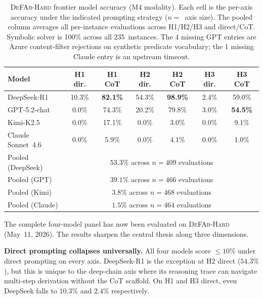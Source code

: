 \documentclass{article}
\theoremstyle{definition}
\begin{document}
\begin{table}[h]
\centering
\caption{\textsc{DeFAb-Hard} frontier model accuracy (M4 modality). Each cell is the per-axis accuracy under the indicated prompting strategy ($n=$~axis size). The pooled column averages all per-instance evaluations across H1/H2/H3 and direct/CoT. Symbolic solver is 100\% across all 235~instances. The 4 missing GPT entries are Azure content-filter rejections on synthetic predicate vocabulary; the 1 missing Claude entry is an upstream timeout.}
\label{tab:defabhard_results}
\small
\begin{tabular}{@{}lcccccc@{}}
\toprule
\textbf{Model} & H1 dir. & H1 CoT & H2 dir. & H2 CoT & H3 dir. & H3 CoT \\
\midrule
DeepSeek-R1         & 10.3\%          & \textbf{82.1\%} & 54.3\%          & \textbf{98.9\%} & 2.4\%  & 59.0\%          \\
GPT-5.2-chat        & 0.0\%           & 74.3\%          & 20.2\%          & 79.8\%          & 3.0\%  & \textbf{54.5\%} \\
Kimi-K2.5           & 0.0\%           & 17.1\%          & 0.0\%           & 3.0\%           & 0.0\%  & 9.1\%           \\
Claude Sonnet~4.6   & 0.0\%           & 5.9\%           & 0.0\%           & 4.1\%           & 0.0\%  & 1.0\%           \\
\midrule
Pooled (DeepSeek)   & \multicolumn{6}{c}{$\mathbf{53.3\%}$ across $n=409$ evaluations}                                         \\
Pooled (GPT)        & \multicolumn{6}{c}{$39.1\%$ across $n=466$ evaluations}                                                  \\
Pooled (Kimi)       & \multicolumn{6}{c}{$3.8\%$ across $n=468$ evaluations}                                                   \\
Pooled (Claude)     & \multicolumn{6}{c}{$1.5\%$ across $n=464$ evaluations}                                                   \\
\bottomrule
\end{tabular}
\end{table}

The complete four-model panel has now been evaluated on \textsc{DeFAb-Hard} (May~11, 2026). The results sharpen the central thesis along three dimensions.

\textbf{Direct prompting collapses universally.} All four models score $\leq 10\%$ under direct prompting on every axis. DeepSeek-R1 is the exception at H2 direct ($54.3\%$), but this is unique to the deep-chain axis where its reasoning trace can navigate multi-step derivation without the CoT scaffold. On H1 and H3 direct, even DeepSeek falls to $10.3\%$ and $2.4\%$ respectively.
\end{document}
